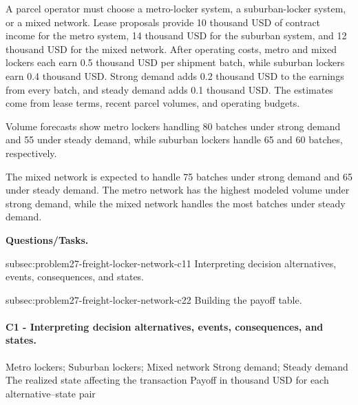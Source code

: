 	A parcel operator must choose a metro-locker system, a suburban-locker system, or a mixed network. Lease proposals provide 10 thousand USD of contract income for the metro system, 14 thousand USD for the suburban system, and 12 thousand USD for the mixed network. After operating costs, metro and mixed lockers each earn 0.5 thousand USD per shipment batch, while suburban lockers earn 0.4 thousand USD. Strong demand adds 0.2 thousand USD to the earnings from every batch, and steady demand adds 0.1 thousand USD. The estimates come from lease terms, recent parcel volumes, and operating budgets.
	
	Volume forecasts show metro lockers handling 80 batches under strong demand and 55 under steady demand, while suburban lockers handle 65 and 60 batches, respectively.
	
	The mixed network is expected to handle 75 batches under strong demand and 65 under steady demand. The metro network has the highest modeled volume under strong demand, while the mixed network handles the most batches under steady demand.

	\textbf{Questions/Tasks.}
	\begin{enumerate}
	\CriterionTask
	{subsec:problem27-freight-locker-network-c1}{1}
	{Interpreting decision alternatives, events, consequences, and states.}

	\CriterionTask
	{subsec:problem27-freight-locker-network-c2}{2}
	{Building the payoff table.}
	\end{enumerate}

\paragraph*{C1 - Interpreting decision alternatives, events, consequences, and states.}
	\label{subsec:problem27-freight-locker-network-c1}
	\DecisionElementsTable
	{Metro lockers; Suburban lockers; Mixed network}
	{Strong demand; Steady demand}
	{The realized state affecting the transaction}
	{Payoff in thousand USD for each alternative--state pair}

